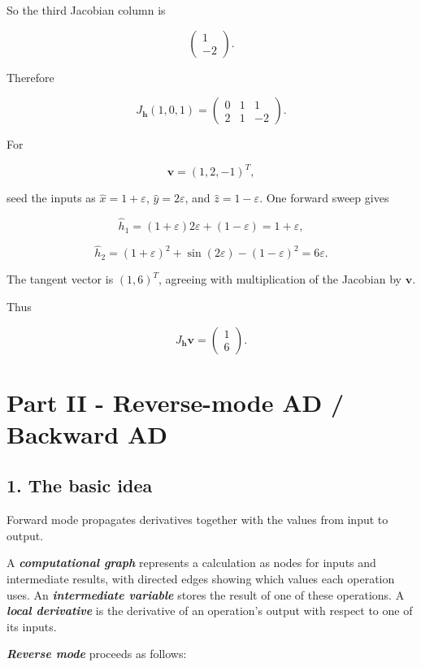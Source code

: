 \documentclass[10pt]{article}
\begin{document}
So the third Jacobian column is

\[
\begin{pmatrix}1\\-2\end{pmatrix}.
\]

Therefore

\[
{
J_{\mathbf h}(1,0,1)
=
\begin{pmatrix}
0 & 1 & 1\\
2 & 1 & -2
\end{pmatrix}
}.
\]

For

\[
\mathbf v=(1,2,-1)^T,
\]

seed the inputs as $\hat x=1+\varepsilon$, $\hat y=2\varepsilon$, and $\hat z=1-\varepsilon$. One forward sweep gives

\[
\hat h_1=(1+\varepsilon)2\varepsilon+(1-\varepsilon)=1+\varepsilon,
\]

\[
\hat h_2=(1+\varepsilon)^2+\sin(2\varepsilon)-(1-\varepsilon)^2=6\varepsilon.
\]

The tangent vector is $(1,6)^T$, agreeing with multiplication of the Jacobian by $\mathbf v$.

Thus

\[
{
J_{\mathbf h}\mathbf v
=
\begin{pmatrix}1\\6\end{pmatrix}
}.
\]
\par\endgroup

\clearpage
\section*{Part II - Reverse-mode AD / Backward AD}
\subsection*{1. The basic idea}
Forward mode propagates derivatives together with the values from input to output.

A \textbf{\textit{computational graph}} represents a calculation as nodes for inputs and intermediate results, with directed edges showing which values each operation uses. An \textbf{\textit{intermediate variable}} stores the result of one of these operations. A \textbf{\textit{local derivative}} is the derivative of an operation's output with respect to one of its inputs.

\textbf{\textit{Reverse mode}} proceeds as follows:
\end{document}
